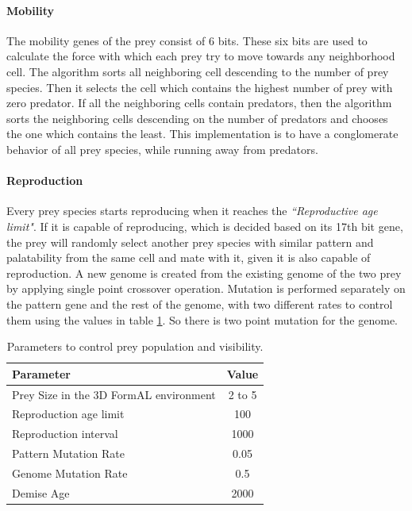 \documentclass[letterpaper]{article}
\numberwithin{equation}{section}
\begin{document}
\paragraph{Mobility}
The mobility genes of the prey consist of 6 bits. These six bits are used to calculate the force with which each prey try to move towards any neighborhood cell. The algorithm sorts all neighboring cell descending to the number of prey species. Then it selects the cell which contains the highest number of prey with zero predator. If all the neighboring cells contain predators, then the algorithm sorts the neighboring cells descending on the number of predators and chooses the one which contains the least. This implementation is to have a conglomerate behavior of all prey species, while running away from predators.

\paragraph{Reproduction}
Every prey species starts reproducing when it reaches the \textsl{``Reproductive age limit"}. If it is capable of reproducing, which is decided based on its 17th bit gene, the prey will randomly select another prey species with similar pattern and palatability from the same cell and mate with it, given it is also capable of reproduction. A new genome is created from the existing genome of the two prey by applying single point crossover operation. Mutation is performed separately on the pattern gene and the rest of the genome, with two different rates to control them using the values in table \ref{tab:prey-control-parameters}. So there is two point mutation for the genome. 

\begin{table}[h]
\small
\centering
\setlength\tabcolsep{2pt}
\begin{tabular}{| l | c |}
	\hline
		\textbf{Parameter} & \textbf{Value}\\ \hline
		Prey Size in the 3D FormAL environment & 2 to 5 \\ \hline
		Reproduction age limit & 100 \\ \hline
		Reproduction interval & 1000 \\ \hline
		Pattern Mutation Rate & 0.05 \\ \hline
		Genome Mutation Rate & 0.5 \\ \hline
		Demise Age & 2000 \\
	\hline
\end{tabular}
\caption{Parameters to control prey population and visibility.}
\label{tab:prey-control-parameters}
\end{table}
\end{document}
